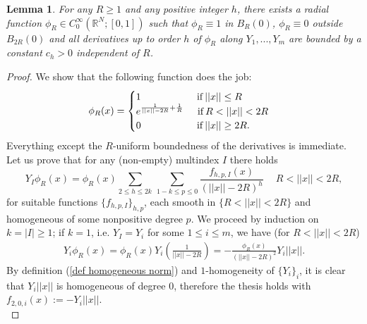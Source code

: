 \documentclass{article}
\newtheorem{lemma}[theorem]{Lemma}
\numberwithin{equation}{section}
\begin{document}
\begin{lemma}
\label{cutoff function lemma}
    For any $R \geq 1$ and any positive integer $h$, there exists a radial function $\phi_R \in C^{\infty}_{0}(\mathbb{R}^N; [0,1])$ such that $\phi_R \equiv 1$ in $B_R(0)$, $\phi_R \equiv 0$ outside $B_{2R}(0)$ and all derivatives up to order $h$ of $\phi_R$ along $Y_1,...,Y_m$ are bounded by a constant $c_h>0$ independent of $R$.
\end{lemma}

\vspace{2mm}

\begin{proof}
    We show that the following function does the job:
    \begin{equation*}
        \phi_R(x)= \begin{cases}
            1 \hspace{2cm} \text{if} \: ||x|| \leq R\\
            e^{\frac{1}{||x||-2R}+\frac{1}{R}} \hspace{5mm} \text{if} \: R<||x||<2R\\
            0 \hspace{2cm} \text{if} \: ||x|| \geq 2R.
        \end{cases}
    \end{equation*}
    Everything except the $R$-uniform boundedness of the derivatives is immediate.\\
    Let us prove that for any (non-empty) multindex $I$ there holds
    \begin{equation}
    \label{rep formula Y_I phi_R}
        Y_I \phi_R(x)= \phi_R(x) \sum_{2 \leq h \leq 2k} \, \sum_{1-k \leq p \leq 0} \frac{f_{h,p,I}(x)}{(||x||-2R)^h} \quad\: R<||x||<2R,
    \end{equation}
    for suitable functions $\{f_{h,p,I}\}_{h,p}$, each smooth in $\{R<||x||<2R\}$ and homogeneous of some nonpositive degree $p$. We proceed by induction on $k=|I| \geq 1$; if $k=1$, i.e. $Y_I=Y_i$ for some $1 \leq i \leq m$, we have (for $R<||x||<2R$)
    \begin{align}
    \label{explicit form Y_i phi_R}
        Y_i \phi_R(x)=\phi_R(x) Y_i\left(\frac{1}{||x||-2R} \right)=-\frac{\phi_R(x)}{(||x||-2R)^2} Y_i ||x||.
    \end{align}
    By definition (\ref{def homogeneous norm}) and $1$-homogeneity of $\{Y_i\}_i$, it is clear that $Y_i ||x||$ is homogeneous of degree $0$, therefore the thesis holds with $f_{2,0,i}(x):=-Y_i ||x||$.\\

\end{proof}
\end{document}
